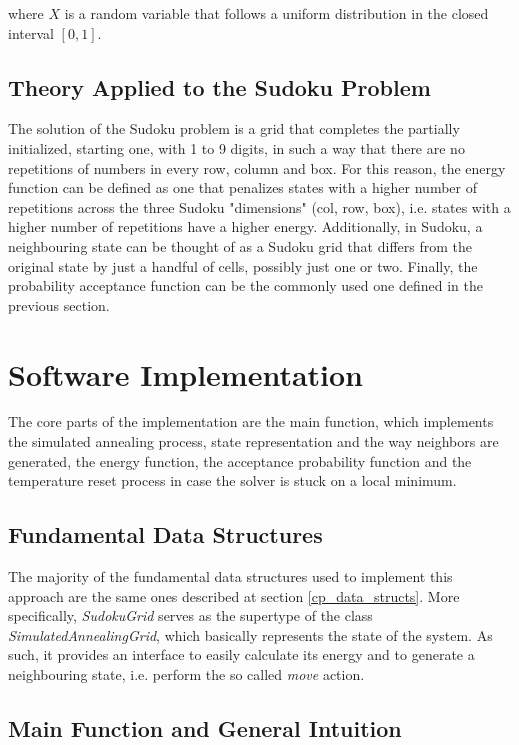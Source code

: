 where $X$ is a random variable that follows a uniform distribution in the closed interval $[0, 1]$.

\subsection{Theory Applied to the Sudoku Problem}

The solution of the Sudoku problem is a grid that completes the partially initialized, starting one, with 1 to 9 digits, in such a way that there are no repetitions of numbers in every row, column and box. For this reason, the energy function can be defined as one that penalizes states with a higher number of repetitions across the three Sudoku "dimensions" (col, row, box), i.e. states with a higher number of repetitions have a higher energy. Additionally, in Sudoku, a neighbouring state can be thought of as a Sudoku grid that differs from the original state by just a handful of cells, possibly just one or two.
Finally, the probability acceptance function can be the commonly used one defined in the previous section.

\section{Software Implementation}

The core parts of the implementation are the main function, which implements the simulated annealing process, state representation and the way neighbors are generated, the energy function, the acceptance probability function and the temperature reset process in case the solver is stuck on a local minimum.

\subsection{Fundamental Data Structures}

The majority of the fundamental data structures used to implement this approach are the same ones described at section \ref{cp_data_structs}. More specifically, \textit{SudokuGrid} serves as the supertype of the class \textit{SimulatedAnnealingGrid}, which basically represents the state of the system. As such, it provides an interface to easily calculate its energy and to generate a neighbouring state, i.e. perform the so called \textit{move} action.

\subsection{Main Function and General Intuition}\label{sim_ann_main_func}

